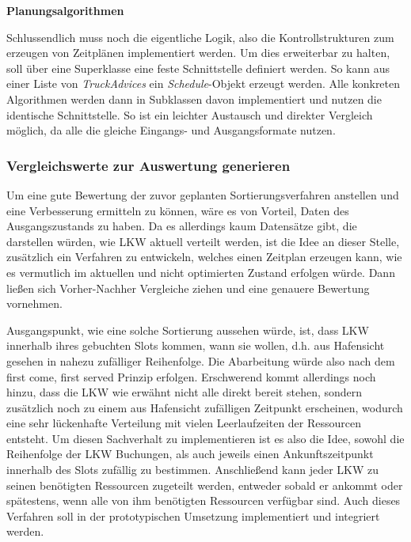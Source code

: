 \textbf{Planungsalgorithmen}

Schlussendlich muss noch die eigentliche Logik, also die Kontrollstrukturen zum erzeugen von Zeitplänen implementiert werden. Um dies erweiterbar zu halten, soll über eine Superklasse eine feste Schnittstelle definiert werden. So kann aus einer Liste von \textit{TruckAdvices} ein \textit{Schedule}-Objekt erzeugt werden. Alle konkreten Algorithmen werden dann in Subklassen davon implementiert und nutzen die identische Schnittstelle. So ist ein leichter Austausch und direkter Vergleich möglich, da alle die gleiche Eingangs- und Ausgangsformate nutzen.


\subsubsection{Vergleichswerte zur Auswertung generieren}
\label{sec:konzeptRsVergleichswerte}

Um eine gute Bewertung der zuvor geplanten Sortierungsverfahren anstellen und eine Verbesserung ermitteln zu können, wäre es von Vorteil, Daten des Ausgangszustands zu haben. Da es allerdings kaum Datensätze gibt, die darstellen würden, wie LKW aktuell verteilt werden, ist die Idee an dieser Stelle, zusätzlich ein Verfahren zu entwickeln, welches einen Zeitplan erzeugen kann, wie es vermutlich im aktuellen und nicht optimierten Zustand erfolgen würde. Dann ließen sich Vorher-Nachher Vergleiche ziehen und eine genauere Bewertung vornehmen.

Ausgangspunkt, wie eine solche Sortierung aussehen würde, ist, dass LKW innerhalb ihres gebuchten Slots kommen, wann sie wollen, d.h. aus Hafensicht gesehen in nahezu zufälliger Reihenfolge. Die Abarbeitung würde also nach dem \glqq{}first come, first served\grqq{} Prinzip erfolgen. Erschwerend kommt allerdings noch hinzu, dass die LKW wie erwähnt nicht alle direkt bereit stehen, sondern zusätzlich noch zu einem aus Hafensicht zufälligen Zeitpunkt erscheinen, wodurch eine sehr lückenhafte Verteilung mit vielen Leerlaufzeiten der Ressourcen entsteht. Um diesen Sachverhalt zu implementieren ist es also die Idee, sowohl die Reihenfolge der LKW Buchungen, als auch jeweils einen Ankunftszeitpunkt innerhalb des Slots zufällig zu bestimmen. Anschließend kann jeder LKW zu seinen benötigten Ressourcen zugeteilt werden, entweder sobald er ankommt oder spätestens, wenn alle von ihm benötigten Ressourcen verfügbar sind. Auch dieses Verfahren soll in der prototypischen Umsetzung implementiert und integriert werden.



